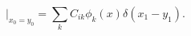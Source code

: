 \begin{equation}
[j_0(x), \phi_i(y)]|_{x_0=y_0} = \sum_k C_{ik}\phi_k(x) \delta(x_1-y_1).
\label{commutation}
\end{equation}

